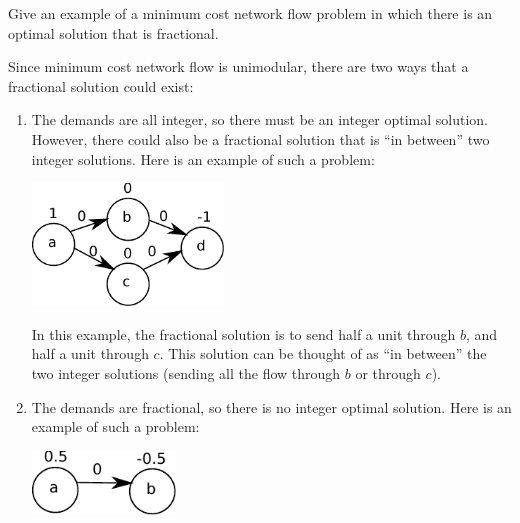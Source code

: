 \documentclass[fleqn]{homework}
\begin{document}
  \begin{problem}{2}
    \begin{question}
      Give an example of a minimum cost network flow problem in which there is
      an optimal solution that is fractional.
    \end{question}

    Since minimum cost network flow is unimodular, there are two ways that a
    fractional solution could exist:

    \begin{enumerate}
    \item The demands are all integer, so there must be an integer optimal
      solution.  However, there could also be a fractional solution that is ``in
      between'' two integer solutions.  Here is an example of such a problem:

      \includegraphics[width=0.4\textwidth]{problem2-eg1.pdf}

      In this example, the fractional solution is to send half a unit through
      $b$, and half a unit through $c$.  This solution can be thought of as ``in
      between'' the two integer solutions (sending all the flow through $b$ or
      through $c$).

    \item The demands are fractional, so there is no integer optimal solution.
      Here is an example of such a problem:

      \includegraphics[width=0.3\textwidth]{problem2-eg2.pdf}
    \end{enumerate}
  \end{problem}
\end{document}
